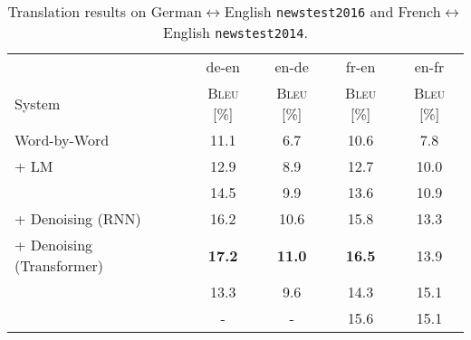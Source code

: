 \documentclass[11pt, a4paper, landscape]{article}
\begin{document}
	
	\vfill
	\NewPage
	\vfill
	\begin{table}
	\caption{Translation results on German$\leftrightarrow$English \texttt{newstest2016} and French$\leftrightarrow$English \texttt{newstest2014}.}
	  \centering
		\begin{tabular}{lcccc}
		  	\toprule
		  	& de-en & en-de & fr-en & en-fr\\
		  	System & \textsc{Bleu} [\%] & \textsc{Bleu} [\%] & \textsc{Bleu} [\%] & \textsc{Bleu} [\%]\\
		  	\midrule
		  	Word-by-Word  & 11.1 & 6.7 & 10.6 & 7.8\\
		  	\midrule
		  	+ LM  & 12.9 & 8.9 & 12.7 & 10.0\\
		  	& 14.5 & 9.9 & 13.6 & 10.9\\
		  	\midrule
		  	\hspace{10pt}+ Denoising (RNN)  & 16.2 & 10.6 & 15.8 & 13.3 \\
		  	\hspace{10pt}+ Denoising (Transformer) & \textbf{17.2} & \textbf{11.0} & \textbf{16.5} & 13.9 \\
		  	\midrule
		  	\cite{lample2017unsupervised} & 13.3 & 9.6 & 14.3 & 15.1\\
		  	\cite{artetxe2017unsupervised} & - & - & 15.6 & 15.1\\
		  	\bottomrule
		\end{tabular}

		\label{tab:results}
	\end{table}	
	\vfill
\end{document}
